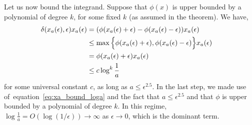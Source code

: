 \documentclass[10pt]{article} %
\def\eqref#1{equation~\ref{#1}}
\theoremstyle{plain}
\theoremstyle{definition}
\theoremstyle{remark}
\newcommand{\svcomment}[1]{\textcolor{red}{SV: #1}}
\begin{document}
Let us now bound the integrand. Suppose that $\phi(x)$ is upper bounded by a polynomial of degree $k$, for some fixed $k$ (as assumed in the theorem). We have,
\begin{align}
\delta(x_a(\epsilon),\epsilon)x_a(\epsilon) &= (\phi(x_a(\epsilon)+\epsilon)-\phi(x_a(\epsilon)-\epsilon))x_a(\epsilon)  &\notag\\
&\leq \max\Big\{\phi(x_a(\epsilon)+\epsilon),\phi(x_a(\epsilon)-\epsilon)\Big\}x_a(\epsilon)  &\notag\\
&= \phi(x_a(\epsilon)+\epsilon)x_a(\epsilon)  &\notag\\
&\leq c \log^k\frac{1}{a}
\end{align}
for some universal constant $c$, as long as $a\leq \epsilon^{2.5}$. In the last step, we made use of~\eqref{eq:xa_bound_loga} and the fact that $a\leq \epsilon^{2.5}$ and that $\phi$ is upper bounded by a polynomial of degree $k$. In this regime, $\log\frac{1}{a}=O(\log(1/\epsilon))\to\infty$ as $\epsilon\to 0$, which is the dominant term. 
\iffalse
\end{document}
